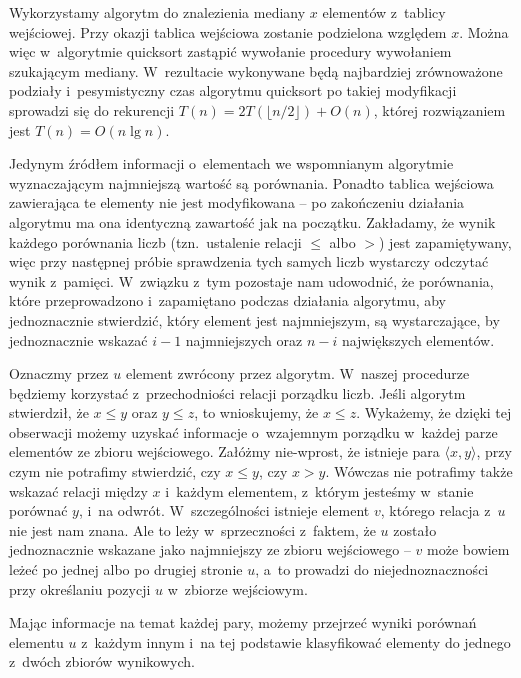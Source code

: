 \exercise %

\noindent Wykorzystamy algorytm  do znalezienia mediany $x$ elementów z~tablicy wejściowej. Przy okazji tablica wejściowa zostanie podzielona względem $x$. Można więc w~algorytmie quicksort zastąpić wywołanie procedury  wywołaniem  szukającym mediany. W~rezultacie wykonywane będą najbardziej zrównoważone podziały i~pesymistyczny czas algorytmu quicksort po takiej modyfikacji sprowadzi się do rekurencji $T(n)=2T(\lfloor n/2\rfloor)+O(n)$, której rozwiązaniem jest $T(n)=O(n\lg n)$.

\exercise %
Jedynym źródłem informacji o~elementach we wspomnianym algorytmie wyznaczającym  najmniejszą wartość są porównania. Ponadto tablica wejściowa zawierająca te elementy nie jest modyfikowana -- po zakończeniu działania algorytmu ma ona identyczną zawartość jak na początku. Zakładamy, że wynik każdego porównania liczb (tzn.\ ustalenie relacji $\le$ albo $>$) jest zapamiętywany, więc przy następnej próbie sprawdzenia tych samych liczb wystarczy odczytać wynik z~pamięci. W~związku z~tym pozostaje nam udowodnić, że porównania, które przeprowadzono i~zapamiętano podczas działania algorytmu, aby jednoznacznie stwierdzić, który element jest  najmniejszym, są wystarczające, by jednoznacznie wskazać $i-1$ najmniejszych oraz $n-i$ największych elementów.

Oznaczmy przez $u$ element zwrócony przez algorytm. W~naszej procedurze będziemy korzystać z~przechodniości relacji porządku liczb. Jeśli algorytm stwierdził, że $x\le y$ oraz $y\le z$, to wnioskujemy, że $x\le z$. Wykażemy, że dzięki tej obserwacji możemy uzyskać informacje o~wzajemnym porządku w~każdej parze elementów ze zbioru wejściowego. Załóżmy nie-wprost, że istnieje para $\langle x,y\rangle$, przy czym nie potrafimy stwierdzić, czy $x\le y$, czy $x>y$. Wówczas nie potrafimy także wskazać relacji między $x$ i~każdym elementem, z~którym jesteśmy w~stanie porównać $y$, i~na odwrót. W~szczególności istnieje element $v$, którego relacja z~$u$ nie jest nam znana. Ale to leży w~sprzeczności z~faktem, że $u$ zostało jednoznacznie wskazane jako  najmniejszy ze zbioru wejściowego -- $v$ może bowiem leżeć po jednej albo po drugiej stronie $u$, a~to prowadzi do niejednoznaczności przy określaniu pozycji $u$ w~zbiorze wejściowym.

Mając informacje na temat każdej pary, możemy przejrzeć wyniki porównań elementu $u$ z~każdym innym i~na tej podstawie klasyfikować elementy do jednego z~dwóch zbiorów wynikowych.

